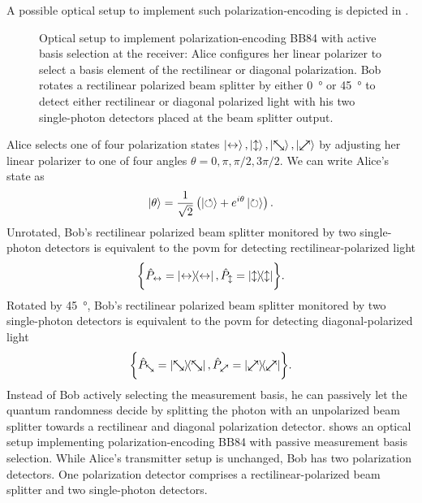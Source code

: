 A possible optical setup to implement such polarization-encoding is depicted in .
\begin{figure}[htb]
	\centering
	
	\caption{Optical setup to implement polarization-encoding BB84 with active basis selection at the receiver: Alice configures her linear polarizer to select a basis element of the rectilinear or diagonal polarization. Bob rotates a rectilinear polarized beam splitter by either \SI{0}{\degree} or \SI{45}{\degree} to detect either rectilinear or diagonal polarized light with his two single-photon detectors placed at the beam splitter output.}\label{fig:polarization_encoding_active}
\end{figure}
Alice selects one of four polarization states $\ket{\leftrightarrow},\ket{\updownarrow},\ket{\nwsearrow},\ket{\neswarrow}$ by adjusting her linear polarizer to one of four angles $\theta=0,\pi,\pi/2,3\pi/2$.
We can write Alice's state as
\begin{equation}
	\ket{\theta}
	=
	\frac{1}{\sqrt{2}}
	\left(
		\ket{\circlearrowleft}
		+
		e^{i\theta}
		\ket{\circlearrowright}
	\right)
	.
\end{equation}
Unrotated, Bob's rectilinear polarized beam splitter monitored by two single-photon detectors is equivalent to the \gls{povm} for detecting rectilinear-polarized light
\begin{equation}
	\biggl\{
		\hat{P}_{\leftrightarrow}
		=
		\ketbra{\leftrightarrow},
		\hat{P}_{\updownarrow}
		=
		\ketbra{\updownarrow}
	\biggr\}
	.
\end{equation}
Rotated by \SI{45}{\degree}, Bob's rectilinear polarized beam splitter monitored by two single-photon detectors is equivalent to the \gls{povm} for detecting diagonal-polarized light
\begin{equation}
	\biggl\{
		\hat{P}_{\nwsearrow}
		=
		\ketbra{\nwsearrow},
		\hat{P}_{\neswarrow}
		=
		\ketbra{\neswarrow}
	\biggr\}
	.
\end{equation}
Instead of Bob actively selecting the measurement basis, he can passively let the quantum randomness decide by splitting the photon with an unpolarized beam splitter towards a rectilinear and diagonal polarization detector.
 shows an optical setup implementing polarization-encoding BB84 with passive measurement basis selection.
While Alice's transmitter setup is unchanged, Bob has two polarization detectors.
One polarization detector comprises a rectilinear-polarized beam splitter and two single-photon detectors.
